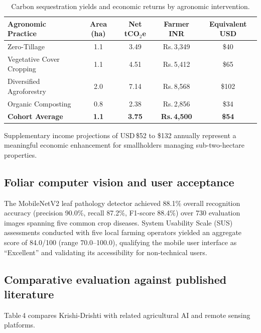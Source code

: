 \documentclass[a4paper,10pt]{article}
\newcommand{\rupee}{Rs.\,}
\begin{document}
\begin{table}[htbp]
  \caption{Carbon sequestration yields and economic returns by agronomic intervention.}
  \label{tab:econ_spie}
  \centering
  \begin{tabular}{lcccc}
    \toprule
    \textbf{Agronomic Practice} & \textbf{Area (ha)} & \textbf{Net tCO$_2$e} & \textbf{Farmer INR} & \textbf{Equivalent USD} \\
    \midrule
    Zero-Tillage               & 1.1 & 3.49 & \rupee 3,349 & \$40 \\
    Vegetative Cover Cropping  & 1.1 & 4.51 & \rupee 5,412 & \$65 \\
    Diversified Agroforestry   & 2.0 & 7.14 & \rupee 8,568 & \$102 \\
    Organic Composting         & 0.8 & 2.38 & \rupee 2,856 & \$34 \\
    \midrule
    \textbf{Cohort Average}    & \textbf{1.1} & \textbf{3.75} & \textbf{\rupee 4,500} & \textbf{\$54} \\
    \bottomrule
  \end{tabular}
\end{table}

Supplementary income projections of USD\,\$52 to \$132 annually represent a meaningful economic enhancement for smallholders managing sub-two-hectare properties.

\subsection{Foliar computer vision and user acceptance}
The MobileNetV2 leaf pathology detector achieved 88.1\% overall recognition accuracy (precision 90.0\%, recall 87.2\%, F1-score 88.4\%) over 730 evaluation images spanning five common crop diseases. System Usability Scale (SUS) assessments conducted with five local farming operators yielded an aggregate score of 84.0/100 (range 70.0--100.0), qualifying the mobile user interface as ``Excellent'' and validating its accessibility for non-technical users.

\subsection{Comparative evaluation against published literature}
Table\,4 compares Krishi-Drishti with related agricultural AI and remote sensing platforms.
\end{document}
